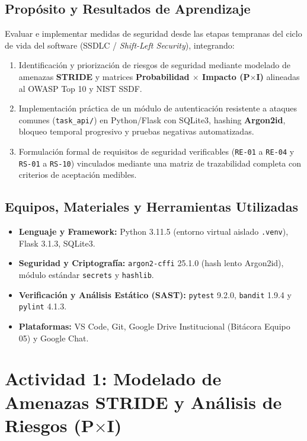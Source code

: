 \documentclass[12pt,a4paper]{article}
\begin{document}
\subsection{Propósito y Resultados de Aprendizaje}
Evaluar e implementar medidas de seguridad desde las etapas tempranas del ciclo de vida del software (SSDLC / \textit{Shift-Left Security}), integrando:
\begin{enumerate}
    \item Identificación y priorización de riesgos de seguridad mediante modelado de amenazas \textbf{STRIDE} y matrices \textbf{Probabilidad $\times$ Impacto (P$\times$I)} alineadas al OWASP Top 10 y NIST SSDF.
    \item Implementación práctica de un módulo de autenticación resistente a ataques comunes (\texttt{task\_api/}) en Python/Flask con SQLite3, hashing \textbf{Argon2id}, bloqueo temporal progresivo y pruebas negativas automatizadas.
    \item Formulación formal de requisitos de seguridad verificables (\texttt{RE-01} a \texttt{RE-04} y \texttt{RS-01} a \texttt{RS-10}) vinculados mediante una matriz de trazabilidad completa con criterios de aceptación medibles.
\end{enumerate}

\subsection{Equipos, Materiales y Herramientas Utilizadas}
\begin{itemize}
    \item \textbf{Lenguaje y Framework:} Python 3.11.5 (entorno virtual aislado \texttt{.venv}), Flask 3.1.3, SQLite3.
    \item \textbf{Seguridad y Criptografía:} \texttt{argon2-cffi} 25.1.0 (hash lento Argon2id), módulo estándar \texttt{secrets} y \texttt{hashlib}.
    \item \textbf{Verificación y Análisis Estático (SAST):} \texttt{pytest} 9.2.0, \texttt{bandit} 1.9.4 y \texttt{pylint} 4.1.3.
    \item \textbf{Plataformas:} VS Code, Git, Google Drive Institucional (Bitácora Equipo 05) y Google Chat.
\end{itemize}

\section{Actividad 1: Modelado de Amenazas STRIDE y Análisis de Riesgos (P$\times$I)}
\end{document}
